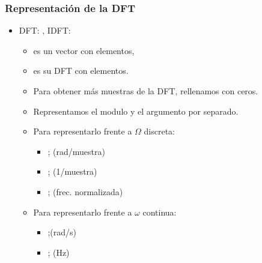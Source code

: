\documentclass{beamer}
\numberwithin{section}{part}
\begin{document}
  
\begin{frame}
  \frametitle{Representación de la DFT}
  
  \footnotesize
  \begin{itemize}  
    \item DFT: \color{black}, IDFT: 
    \begin{itemize}
      \footnotesize
      \item {} \color{black} es un vector con  \color{black} elementos,
      \item {} \color{black} es su DFT con  \color{black}  elementos.
      \item Para obtener más muestras de la DFT, rellenamos  \color{black}con ceros.
      \item Representamos el modulo y el argumento por separado.
      \item Para representarlo frente a $\Omega$ discreta:
      \begin{itemize}
        \item {};\color{black} (rad/muestra) 
        \item {};\color{black}  (1/muestra)
        \item {};\color{black} (frec. normalizada) 
      \end{itemize}
      \item Para representarlo frente a $\omega$ continua:
      \begin{itemize}
        \item {};\color{black}(rad/s) 
        \item {};\color{black} (Hz)
      \end{itemize}
    \end{itemize}    
  \end{itemize}
\end{frame}

 
\end{document}
